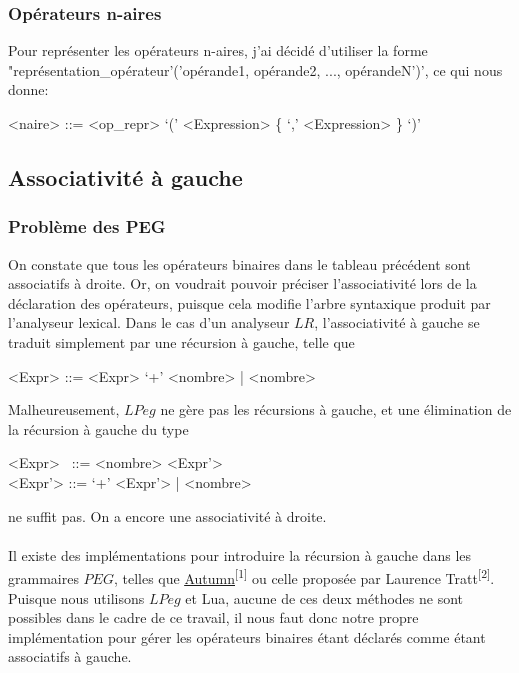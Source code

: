 \documentclass{article}
\begin{document}
\subsubsection{Opérateurs n-aires}
Pour représenter les opérateurs n-aires, j'ai décidé d'utiliser la forme "représentation\_opérateur'('opérande1, opérande2, ..., opérandeN')', ce qui nous donne:
\begin{grammar}
	<naire> ::= <op\_repr> `(' <Expression> \{ `,' <Expression> \} `)'
\end{grammar}
\subsection{Associativité à gauche}
\subsubsection{Problème des PEG}
On constate que tous les opérateurs binaires dans le tableau précédent sont associatifs à droite. Or, on voudrait pouvoir préciser l'associativité lors de la déclaration des opérateurs, puisque cela modifie l'arbre syntaxique produit par l'analyseur lexical. Dans le cas d'un analyseur $LR$, l'associativité à gauche se traduit simplement par une récursion à gauche, telle que
\begin{grammar}
	<Expr> ::= <Expr> `+' <nombre> | <nombre>
\end{grammar}
Malheureusement, $LPeg$ ne gère pas les récursions à gauche, et une élimination de la récursion à gauche du type
\begin{grammar}
<Expr> \ ::= <nombre> <Expr'> \\
<Expr'> ::= `+' <Expr'> | <nombre>
\end{grammar}
ne suffit pas. On a encore une associativité à droite. \\ \\
Il existe des implémentations pour introduire la récursion à gauche dans les grammaires $PEG$, telles que \underline{\href{https://github.com/norswap/whimsy/blob/master/doc/autumn/README.md}{Autumn}}\textsuperscript{[1]} ou celle proposée par Laurence Tratt\textsuperscript{[2]}. Puisque nous utilisons $LPeg$ et Lua, aucune de ces deux méthodes ne sont possibles dans le cadre de ce travail, il nous faut donc notre propre implémentation pour gérer les opérateurs binaires étant déclarés comme étant associatifs à gauche.
\end{document}
